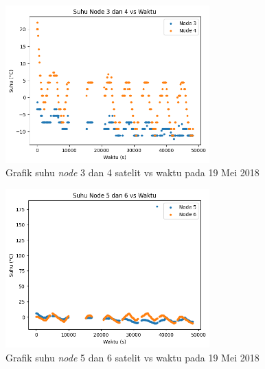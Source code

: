 \begin{figure}[H]
\setlength{}
\begin{center}
\includegraphics[width=0.7\textwidth]{fig/raw_node34_temp_2018-05-19.png}
	\caption{Grafik suhu \textit{node} 3 dan 4 satelit vs waktu pada 19 Mei 2018}
\label{fig:rawtemp3419}
\end{center}
\end{figure}

\begin{figure}[H]
\setlength{}
\begin{center}
\includegraphics[width=0.7\textwidth]{fig/raw_node56_temp_2018-05-19.png}
	\caption{Grafik suhu \textit{node} 5 dan 6 satelit vs waktu pada 19 Mei 2018}
\label{fig:rawtemp5619}
\end{center}
\end{figure}

